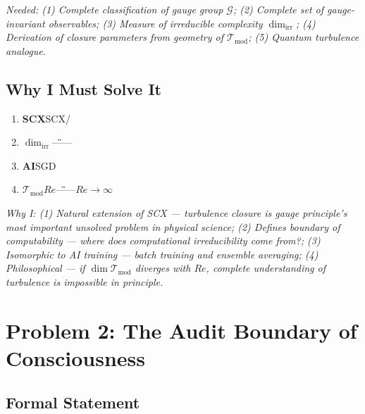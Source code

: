 \documentclass[12pt,a4paper]{article}
\theoremstyle{remark}
\newcommand{\G}{\mathcal{G}}
\newcommand{\T}{\mathcal{T}}
\begin{document}
\medskip
\noindent\textit{Needed: (1) Complete classification of gauge group $\G$; (2) Complete set of gauge-invariant observables; (3) Measure of irreducible complexity $\dim_{\text{irr}}$; (4) Derivation of closure parameters from geometry of $\T_{\text{mod}}$; (5) Quantum turbulence analogue.}

\subsection{ Why I Must Solve It}

\begin{enumerate}[label=(\arabic*)]
    \item \textbf{SCX}SCX/
    
    \item \textbf{}$\dim_{\text{irr}}$\"\"——
    
    \item \textbf{AI}SGD
    
    \item \textbf{}$\T_{\text{mod}}$$Re$\"\"——$Re \to \infty$
\end{enumerate}

\medskip
\noindent\textit{Why I: (1) Natural extension of SCX — turbulence closure is gauge principle's most important unsolved problem in physical science; (2) Defines boundary of computability — where does computational irreducibility come from?; (3) Isomorphic to AI training — batch training and ensemble averaging; (4) Philosophical — if $\dim \T_{\text{mod}}$ diverges with $Re$, complete understanding of turbulence is impossible in principle.}

\newpage


\section{}
\section*{Problem 2: The Audit Boundary of Consciousness}

\subsection{ Formal Statement}
\end{document}
